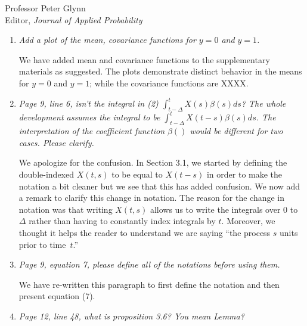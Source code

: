 \documentclass[11pt]{letter} %
\begin{document}
\begin{letter}{Professor
	Peter Glynn\\
	Editor, {\em Journal of Applied Probability}}
\begin{enumerate}
Another reason for treating these two distinctly is that the missing data imputation from XXXX requires distinct covariance functions.  We do think one could marginalize across the two if the mean and covariance functions are not expected to differ greatly and state as such in Section XX (in blue) where we discuss the new Figure XX of the mean and covariance functions for $y=0$ and $y=1$.
\vspace{5mm}

\item {\it Add a plot of the mean, covariance functions for $y=0$ and $y=1$.}

\vspace{5mm}
We have added mean and covariance functions to the supplementary materials as suggested.  The plots demonstrate distinct behavior in the means for $y=0$ and $y=1$; while the covariance functions are XXXX.
\vspace{5mm}

\item {\it Page 9, line 6, isn’t the integral in (2) $\int_{t-\Delta}^t X(s) \beta(s)ds$? The whole development assumes the integral to be $\int_{t-\Delta}^t X(t-s) \beta(s)ds$. The interpretation of the coefficient function $\beta()$ would be different for two cases. Please clarify.}

\vspace{5mm}
We apologize for the confusion.  In Section 3.1, we started by defining the double-indexed $X(t,s)$ to be equal to $X(t-s)$ in order to make the notation a bit cleaner but we see that this has added confusion.  We now add a remark to clarify this change in notation.  The reason for the change in notation was that writing $X(t,s)$ allows us to write the integrals over $0$ to $\Delta$ rather than having to constantly index integrals by $t$.  Moreover, we thought it helps the reader to understand we are saying ``the process $s$ units prior to time~$t$.''
\vspace{5mm}

\item {\it Page 9, equation 7, please define all of the notations before using them.}

\vspace{5mm}
We have re-written this paragraph to first define the notation and then present equation (7).
\vspace{5mm}

\item {\it Page 12, line 48, what is proposition 3.6? You mean Lemma?}


\end{enumerate}
\end{letter}
\end{document}
